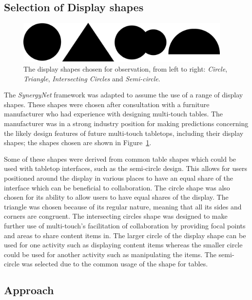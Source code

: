 \documentclass[twocolumn,compsoc]{cvm}
\begin{document}
{\subsection{Selection of Display shapes}
\label{subsec:selectionofdisplayshapes} 

\begin{figure}[h!] 
 \centering
  \includegraphics[width=0.95\textwidth]{figures/DisplayShapes.jpeg}
  \caption{The display shapes chosen for observation, from left to right:  {\emph{Circle}}, {\emph{Triangle}}, {\emph{Intersecting Circles}} and {\emph{Semi-circle}}.}
  \label{fig:displayshapes}
\end{figure}

The {\emph{SynergyNet}} framework was adapted to assume the use of a range of display shapes.
These shapes were chosen after consultation with a furniture manufacturer who had experience with designing multi-touch tables.
The manufacturer was in a strong industry position for making predictions concerning the likely design features of future multi-touch tabletops, including their display shapes; the shapes chosen are shown in Figure~\ref{fig:displayshapes}.

Some of these shapes were derived from common table shapes which could be used with tabletop interfaces, such as the semi-circle design.
This allows for users positioned around the display in various places to have an equal share of the interface which can be beneficial to collaboration.
The circle shape was also chosen for its ability to allow users to have equal shares of the display.
The triangle was chosen because of its regular nature, meaning that all its sides and corners are congruent.
The intersecting circles shape was designed to make further use of multi-touch's facilitation of collaboration by providing focal points and areas to share content items in.
The larger circle of the display shape can be used for one activity such as displaying content items whereas the smaller circle could be used for another activity such as manipulating the items.
The semi-circle was selected due to the common usage of the shape for tables.


\subsection{Approach}
\label{subsec:approach} 

}
\end{document}
